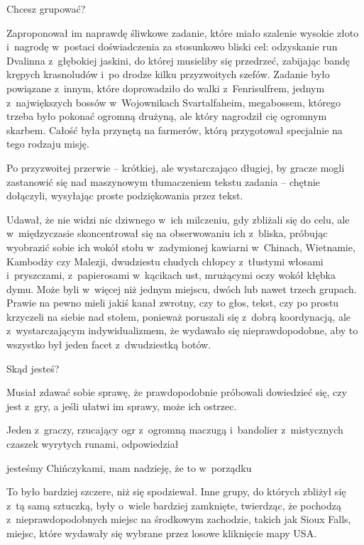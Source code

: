 \documentclass[oneside,polish,11pt,rmheadings]{mwbk}
\begin{document}
\noindent  {\textgreater} Chcesz grupować?

Zaproponował im naprawdę śliwkowe zadanie, które miało szalenie wysokie złoto i~nagrodę w~postaci doświadczenia za stosunkowo bliski cel: odzyskanie run Dvalinna z~głębokiej jaskini, do której musieliby się przedrzeć, zabijając bandę krępych krasnoludów i~po drodze kilku przyzwoitych szefów. Zadanie było powiązane z~innym, które doprowadziło do walki z~Fenrisulfrem, jednym z~największych bossów w~Wojownikach Svartalfaheim, megabossem, którego trzeba było pokonać ogromną drużyną, ale który nagrodził cię ogromnym skarbem. Całość była przynętą na farmerów, którą przygotował specjalnie na tego rodzaju misję.

Po przyzwoitej przerwie -- krótkiej, ale wystarczająco długiej, by gracze mogli zastanowić się nad maszynowym tłumaczeniem tekstu zadania -- chętnie dołączyli, wysyłając proste podziękowania przez tekst.

Udawał, że nie widzi nic dziwnego w~ich milczeniu, gdy zbliżali się do celu, ale w~międzyczasie skoncentrował się na obserwowaniu ich z~bliska, próbując wyobrazić sobie ich wokół stołu w~zadymionej kawiarni w~Chinach, Wietnamie, Kambodży czy Malezji, dwudziestu chudych chłopcy z~tłustymi włosami i~pryszczami, z~papierosami w~kącikach ust, mrużącymi oczy wokół kłębka dymu. Może byli w~więcej niż jednym miejscu, dwóch lub nawet trzech grupach. Prawie na pewno mieli jakiś kanał zwrotny, czy to głos, tekst, czy po prostu krzyczeli na siebie nad stołem, ponieważ poruszali się z~dobrą koordynacją, ale z~wystarczającym indywidualizmem, że wydawało się nieprawdopodobne, aby to wszystko był jeden facet z~dwudziestką botów.

\noindent {\textgreater} Skąd jesteś?

Musiał zdawać sobie sprawę, że prawdopodobnie próbowali dowiedzieć się, czy jest z~gry, a jeśli ułatwi im sprawy, może ich ostrzec.

Jeden z~graczy, rzucający ogr z~ogromną maczugą i~bandolier z~mistycznych czaszek wyrytych runami, odpowiedział

\noindent {\textgreater} jesteśmy Chińczykami, mam nadzieję, że to w~porządku

To było bardziej szczere, niż się spodziewał. Inne grupy, do których zbliżył się z~tą samą sztuczką, były o~wiele bardziej zamknięte, twierdząc, że pochodzą z~nieprawdopodobnych miejsc na środkowym zachodzie, takich jak Sioux Falls, miejsc, które wydawały się wybrane przez losowe kliknięcie mapy USA.
\end{document}
